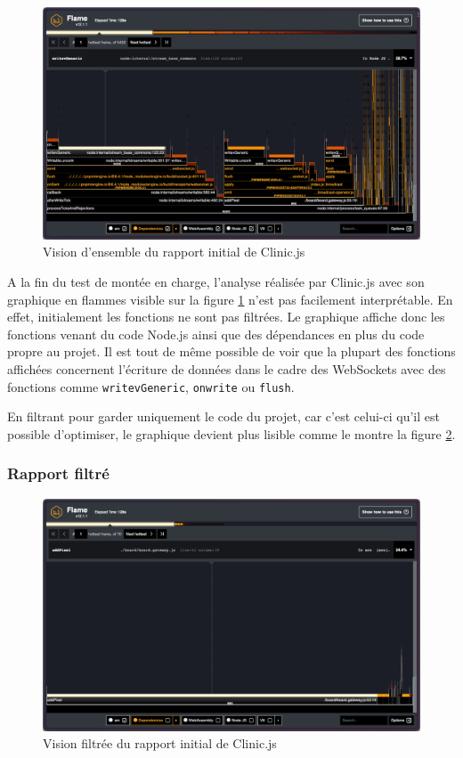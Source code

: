 \begin{figure}[H]
  \centering
  \includegraphics[width=1\textwidth]{./assets/figures/flame/flame1-overview.png}
  \caption{Vision d'ensemble du rapport initial de Clinic.js}
  \label{fig:flame1-overview}
\end{figure}

A la fin du test de montée en charge, l'analyse réalisée par Clinic.js avec son graphique en flammes visible sur la figure \ref{fig:flame1-overview} n'est pas facilement interprétable. En effet, initialement les fonctions ne sont pas filtrées. Le graphique affiche donc les fonctions venant du code Node.js ainsi que des dépendances en plus du code propre au projet. Il est tout de même possible de voir que la plupart des fonctions affichées concernent l'écriture de données dans le cadre des WebSockets avec des fonctions comme \texttt{writevGeneric}, \texttt{onwrite} ou \texttt{flush}.

En filtrant pour garder uniquement le code du projet, car c'est celui-ci qu'il est possible d'optimiser, le graphique devient plus lisible comme le montre la figure \ref{fig:flame1-filtered}.

\subsubsection{Rapport filtré}

\begin{figure}[H]
  \centering
  \includegraphics[width=1\textwidth]{./assets/figures/flame/flame1-filtered.png}
  \caption{Vision filtrée du rapport initial de Clinic.js}
  \label{fig:flame1-filtered}
\end{figure}

